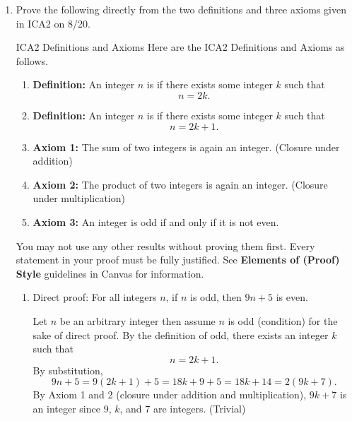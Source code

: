 \begin{enumerate}
  \newpage





























  \item 
  Prove the following directly from the two definitions and three axioms
  given in ICA2 on 8/20.
  \begin{define}{ICA2 Definitions and Axioms}
    Here are the ICA2 Definitions and Axioms as follows.
    \begin{enumerate}
      \item \textbf{Definition:} An integer $n$ is  if there exists some integer $k$ such that
      \[
      n = 2k.
      \]
      \item \textbf{Definition:} An integer $n$ is  if there exists some integer $k$ such that
      \[
      n = 2k + 1.
      \]
      \item \textbf{Axiom 1:} The sum of two integers is again an integer. (Closure under addition)
      \item \textbf{Axiom 2:} The product of two integers is again an integer. (Closure under multiplication)
      \item \textbf{Axiom 3:} An integer is odd if and only if it is not even.
    \end{enumerate}
  \end{define}
  You may not use any other results without proving them first.
  Every statement in your proof must be fully justified.
  See \textbf{Elements of (Proof) Style} guidelines in Canvas for information.
  \begin{enumerate}
  \item Direct proof: For all integers $n$, if $n$ is odd, then $9n + 5$ is even.
  \begin{subprove}
    Let $n$ be an arbitrary integer then assume $n$ is odd (condition) for the sake of direct proof. 
    By the definition of odd, there exists an integer $k$ such that
    \[
      n = 2k + 1.
    \]
    By substitution, 
    \[
      9n + 5 = 9(2k + 1) + 5 = 18k + 9 + 5 = 18k + 14= 2(9k + 7).
    \]
    By Axiom 1 and 2 (closure under addition and multiplication), $9k+7$ is an integer since $9$, $k$, and $7$ are integers. (Trivial)


\end{subprove}
\end{enumerate}
\end{enumerate}
